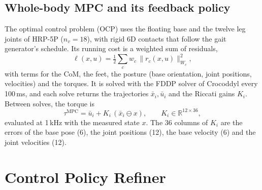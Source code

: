 \documentclass[conference]{IEEEtran}
\newcommand{\R}{\mathbb{R}}
\newcommand{\mpc}{\mathrm{MPC}}
\newcommand{\xb}{\bar{x}}
\newcommand{\ub}{\bar{u}}
\begin{document}
\subsection{Whole-body MPC and its feedback policy}
The optimal control problem (OCP) uses the floating base and the twelve leg joints of HRP-5P \cite{kaneko2019hrp5p} ($n_v=18$), with rigid 6D contacts that follow the gait generator's schedule.
Its running cost is a weighted sum of residuals,
\begin{equation}
\ell(x,u)=\tfrac12\sum_{c}w_c\,\|r_c(x,u)\|^2_{W_c},
\label{eq:costwb}
\end{equation}
with terms for the CoM, the feet, the posture (base orientation, joint positions, velocities) and the torques.
It is solved with the FDDP solver of Crocoddyl \cite{mastalli2020crocoddyl} every 100\,ms, and each solve returns the trajectories $\xb_i,\ub_i$ and the Riccati gains $K_i$.
Between solves, the torque is
\begin{equation}
\tau^{\mpc}=\ub_i+K_i\,(\xb_i\ominus x),\qquad K_i\in\R^{12\times36},
\label{eq:riccati}
\end{equation}
evaluated at 1\,kHz with the measured state $x$.
The 36 columns of $K_i$ are the errors of the base pose (6), the joint positions (12), the base velocity (6) and the joint velocities (12).

\section{Control Policy Refiner}
\label{sec:method}
\end{document}
